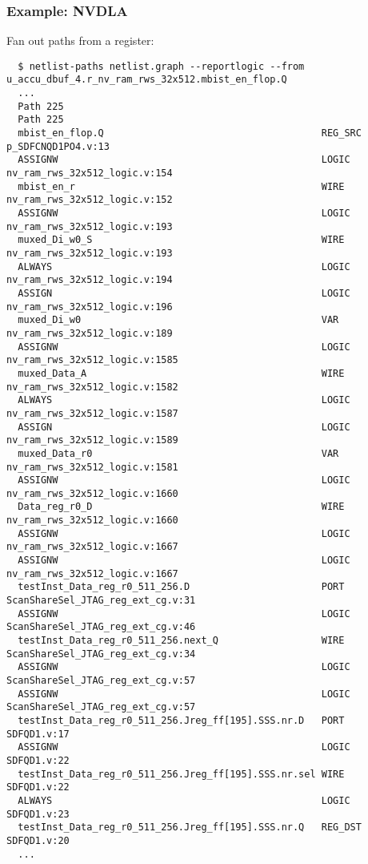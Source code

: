 \documentclass[professionalfonts]{beamer}
\begin{document}
\begin{frame}[fragile]
  \frametitle{Example: NVDLA}
  Fan out paths from a register:
  \tiny
  \begin{verbatim}
  $ netlist-paths netlist.graph --reportlogic --from u_accu_dbuf_4.r_nv_ram_rws_32x512.mbist_en_flop.Q
  ...
  Path 225
  Path 225
  mbist_en_flop.Q                                      REG_SRC p_SDFCNQD1PO4.v:13
  ASSIGNW                                              LOGIC   nv_ram_rws_32x512_logic.v:154
  mbist_en_r                                           WIRE    nv_ram_rws_32x512_logic.v:152
  ASSIGNW                                              LOGIC   nv_ram_rws_32x512_logic.v:193
  muxed_Di_w0_S                                        WIRE    nv_ram_rws_32x512_logic.v:193
  ALWAYS                                               LOGIC   nv_ram_rws_32x512_logic.v:194
  ASSIGN                                               LOGIC   nv_ram_rws_32x512_logic.v:196
  muxed_Di_w0                                          VAR     nv_ram_rws_32x512_logic.v:189
  ASSIGNW                                              LOGIC   nv_ram_rws_32x512_logic.v:1585
  muxed_Data_A                                         WIRE    nv_ram_rws_32x512_logic.v:1582
  ALWAYS                                               LOGIC   nv_ram_rws_32x512_logic.v:1587
  ASSIGN                                               LOGIC   nv_ram_rws_32x512_logic.v:1589
  muxed_Data_r0                                        VAR     nv_ram_rws_32x512_logic.v:1581
  ASSIGNW                                              LOGIC   nv_ram_rws_32x512_logic.v:1660
  Data_reg_r0_D                                        WIRE    nv_ram_rws_32x512_logic.v:1660
  ASSIGNW                                              LOGIC   nv_ram_rws_32x512_logic.v:1667
  ASSIGNW                                              LOGIC   nv_ram_rws_32x512_logic.v:1667
  testInst_Data_reg_r0_511_256.D                       PORT    ScanShareSel_JTAG_reg_ext_cg.v:31
  ASSIGNW                                              LOGIC   ScanShareSel_JTAG_reg_ext_cg.v:46
  testInst_Data_reg_r0_511_256.next_Q                  WIRE    ScanShareSel_JTAG_reg_ext_cg.v:34
  ASSIGNW                                              LOGIC   ScanShareSel_JTAG_reg_ext_cg.v:57
  ASSIGNW                                              LOGIC   ScanShareSel_JTAG_reg_ext_cg.v:57
  testInst_Data_reg_r0_511_256.Jreg_ff[195].SSS.nr.D   PORT    SDFQD1.v:17
  ASSIGNW                                              LOGIC   SDFQD1.v:22
  testInst_Data_reg_r0_511_256.Jreg_ff[195].SSS.nr.sel WIRE    SDFQD1.v:22
  ALWAYS                                               LOGIC   SDFQD1.v:23
  testInst_Data_reg_r0_511_256.Jreg_ff[195].SSS.nr.Q   REG_DST SDFQD1.v:20
  ...
  \end{verbatim}
\end{frame}
\end{document}
